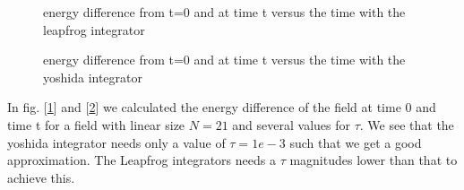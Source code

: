 \documentclass[11pt,a4paper]{article}
\begin{document}
\begin{figure}[H]
\centering
\caption{energy difference from t=0 and at time t versus the time with the leapfrog integrator}
\label{Fig: all_obs_e_vio_leap}
\end{figure}

\begin{figure}[H]
\centering
\caption{energy difference from t=0 and at time t versus the time with the yoshida integrator}
\label{Fig: all_obs_e_vio_yosh}
\end{figure}

In fig. [\ref{Fig: all_obs_e_vio_leap}] and [\ref{Fig: all_obs_e_vio_yosh}] we
calculated the energy difference of the field at time 0 and time t for a field
with linear size $N = 21$ and several values for $\tau$. We see that the yoshida
integrator needs only a value of $\tau = 1e-3$ such that we get a good
approximation. The Leapfrog integrators needs a $\tau$
magnitudes lower than that to achieve this.
\end{document}
